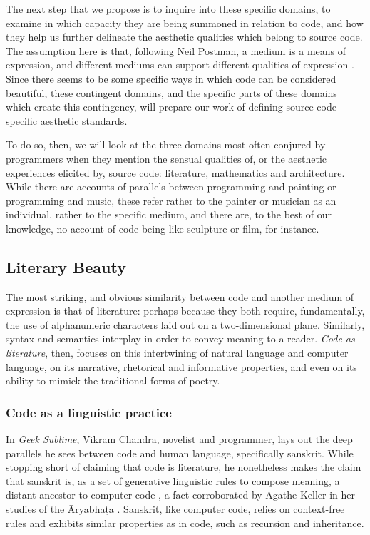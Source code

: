 The next step that we propose is to inquire into these specific domains, to examine in which capacity they are being summoned in relation to code, and how they help us further delineate the aesthetic qualities which belong to source code. The assumption here is that, following Neil Postman, a medium is a means of expression, and different mediums can support different qualities of expression \citep{postman_amusing_1985}. Since there seems to be some specific ways in which code can be considered beautiful, these contingent domains, and the specific parts of these domains which create this contingency, will prepare our work of defining source code-specific aesthetic standards.

To do so, then, we will look at the three domains most often conjured by programmers when they mention the sensual qualities of, or the aesthetic experiences elicited by, source code: literature, mathematics and architecture. While there are accounts of parallels between programming and painting \citep{graham_hackers_2003} or programming and music\citep{mclean_hacking_2004}, these refer rather to the painter or musician as an individual, rather to the specific medium, and there are, to the best of our knowledge, no account of code being like sculpture or film, for instance.

\subsection{Literary Beauty}
\label{subsec:literary-beauty}

The most striking, and obvious similarity between code and another medium of expression is that of literature: perhaps because they both require, fundamentally, the use of alphanumeric characters laid out on a two-dimensional plane. Similarly, syntax and semantics interplay in order to convey meaning to a reader. \emph{Code as literature}, then, focuses on this intertwining of natural language and computer language, on its narrative, rhetorical and informative properties, and even on its ability to mimick the traditional forms of poetry.

\subsubsection{Code as a linguistic practice}
\label{subsubsec:code-linguistic}

In \emph{Geek Sublime}, Vikram Chandra, novelist and programmer, lays out the deep parallels he sees between code and human language, specifically sanskrit. While stopping short of claiming that code is literature, he nonetheless makes the claim that sanskrit is, as a set of generative linguistic rules to compose meaning, a distant ancestor to computer code \citep{chandra_geek_2014}, a fact corroborated by Agathe Keller in her studies of the Āryabhaṭa \citep{keller_textes_2021}. Sanskrit, like computer code, relies on context-free rules and exhibits similar properties as in code, such as recursion and inheritance.

